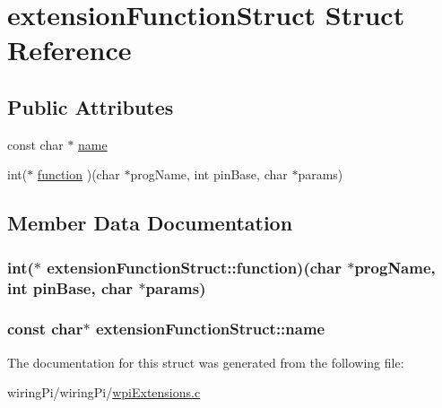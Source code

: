 \hypertarget{structextensionFunctionStruct}{\section{extension\-Function\-Struct Struct Reference}
\label{structextensionFunctionStruct}
}
\subsection*{Public Attributes}
\begin{DoxyCompactItemize}
\item 
const char $\ast$ \hyperlink{structextensionFunctionStruct_a39d212429eefaa68d2680b50cb538b95}{name}
\item 
int($\ast$ \hyperlink{structextensionFunctionStruct_aa562f2602daa10ee7edc6b43ee8e9d71}{function} )(char $\ast$prog\-Name, int pin\-Base, char $\ast$params)
\end{DoxyCompactItemize}


\subsection{Member Data Documentation}
\hypertarget{structextensionFunctionStruct_aa562f2602daa10ee7edc6b43ee8e9d71}{
\subsubsection[{function}]{\setlength{\rightskip}{0pt plus 5cm}int($\ast$ extension\-Function\-Struct\-::function)(char $\ast$prog\-Name, int pin\-Base, char $\ast$params)}}\label{structextensionFunctionStruct_aa562f2602daa10ee7edc6b43ee8e9d71}
\hypertarget{structextensionFunctionStruct_a39d212429eefaa68d2680b50cb538b95}{
\subsubsection[{name}]{\setlength{\rightskip}{0pt plus 5cm}const char$\ast$ extension\-Function\-Struct\-::name}}\label{structextensionFunctionStruct_a39d212429eefaa68d2680b50cb538b95}


The documentation for this struct was generated from the following file\-:\begin{DoxyCompactItemize}
\item 
wiring\-Pi/wiring\-Pi/\hyperlink{wpiExtensions_8c}{wpi\-Extensions.\-c}\end{DoxyCompactItemize}
